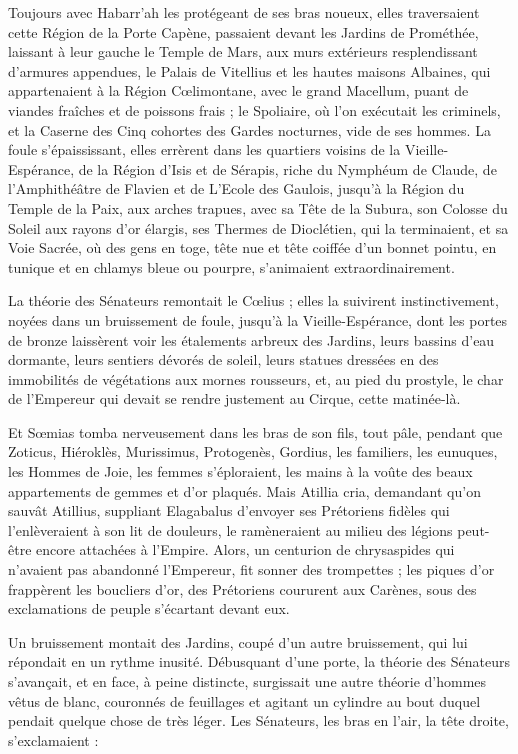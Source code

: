 \documentclass[a4paper, 11pt, oneside, polutonikogreek, french]{article}
\begin{document}
Toujours avec Habarr'ah les protégeant de ses bras noueux, elles traversaient cette Région de la Porte Capène, passaient devant les Jardins de Prométhée, laissant à leur gauche le Temple de Mars, aux murs extérieurs resplendissant d'armures appendues, le Palais de Vitellius et les hautes maisons Albaines, qui appartenaient à la Région Cœlimontane, avec le grand Macellum, puant de viandes fraîches et de poissons frais ; le Spoliaire, où l'on exécutait les criminels, et la Caserne des Cinq cohortes des Gardes nocturnes, vide de ses hommes. La foule s'épaississant, elles errèrent dans les quartiers voisins de la Vieille-Espérance, de la Région d'Isis et de Sérapis, riche du Nymphéum de Claude, de l'Amphithéâtre de Flavien et de L'Ecole des Gaulois, jusqu'à la Région du Temple de la Paix, aux arches trapues, avec sa Tête de la Subura, son Colosse du Soleil aux rayons d'or élargis, ses Thermes de Dioclétien, qui la terminaient, et sa Voie Sacrée, où des gens en toge, tête nue et tête coiffée d'un bonnet pointu, en tunique et en chlamys bleue ou pourpre, s'animaient extraordinairement.

La théorie des Sénateurs remontait le Cœlius ; elles la suivirent instinctivement, noyées dans un bruissement de foule, jusqu'à la Vieille-Espérance, dont les portes de bronze laissèrent voir les étalements arbreux des Jardins, leurs bassins d'eau dormante, leurs sentiers dévorés de soleil, leurs statues dressées en des immobilités de végétations aux mornes rousseurs, et, au pied du prostyle, le char de l'Empereur qui devait se rendre justement au Cirque, cette matinée-là.

Et Sœmias tomba nerveusement dans les bras de son fils, tout pâle, pendant que Zoticus, Hiéroklès, Murissimus, Protogenès, Gordius, les familiers, les eunuques, les Hommes de Joie, les femmes s'éploraient, les mains à la voûte des beaux appartements de gemmes et d'or plaqués. Mais Atillia cria, demandant qu'on sauvât Atillius, suppliant Elagabalus d'envoyer ses Prétoriens fidèles qui l'enlèveraient à son lit de douleurs, le ramèneraient au milieu des légions peut-être encore attachées à l'Empire. Alors, un centurion de chrysaspides qui n'avaient pas abandonné l'Empereur, fit sonner des trompettes ; les piques d'or frappèrent les boucliers d'or, des Prétoriens coururent aux Carènes, sous des exclamations de peuple s'écartant devant eux.

Un bruissement montait des Jardins, coupé d'un autre bruissement, qui lui répondait en un rythme inusité. Débusquant d'une porte, la théorie des Sénateurs s'avançait, et en face, à peine distincte, surgissait une autre théorie d'hommes vêtus de blanc, couronnés de feuillages et agitant un cylindre au bout duquel pendait quelque chose de très léger. Les Sénateurs, les bras en l'air, la tête droite, s'exclamaient :
\end{document}
